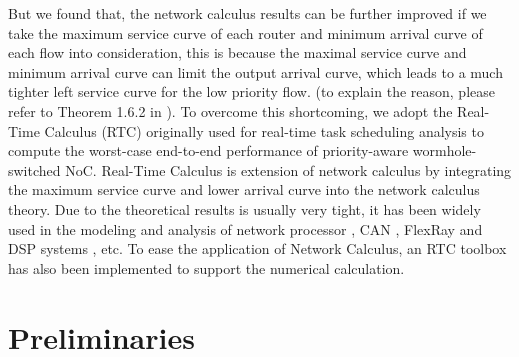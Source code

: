 \documentclass[10pt,journal]{IEEEtran}
\begin{document}
But we found that, the network calculus results can be further improved if we take the maximum service curve of each router and minimum arrival curve of each flow into consideration, this is because the maximal service curve and minimum arrival curve can limit the output arrival curve, which leads to a much tighter left service curve for the low priority flow. (to explain the reason, please refer to Theorem 1.6.2 in \cite{Boudec2001Network}). To overcome this shortcoming, we adopt the Real-Time Calculus (RTC) \cite{ThCN00}\cite{1253607} originally used for real-time task scheduling analysis to compute the worst-case end-to-end performance of priority-aware wormhole-switched NoC. Real-Time Calculus is extension of network calculus by integrating the maximum service curve and lower arrival curve into the network calculus theory. Due to the theoretical results is usually very tight, it has been widely used in the modeling and analysis of network processor \cite{1253838}, CAN \cite{4617308}, FlexRay \cite{Chokshi:2010:PAF:1774088.1774162}\cite{Hagiescu:2007:PAF:1278480.1278554} and DSP systems \cite{thiele2005performance}, etc. To ease the application of Network Calculus, an RTC toolbox \cite{rtc} has also been implemented to support the numerical calculation.

\section{Preliminaries}\label{model}
\end{document}
